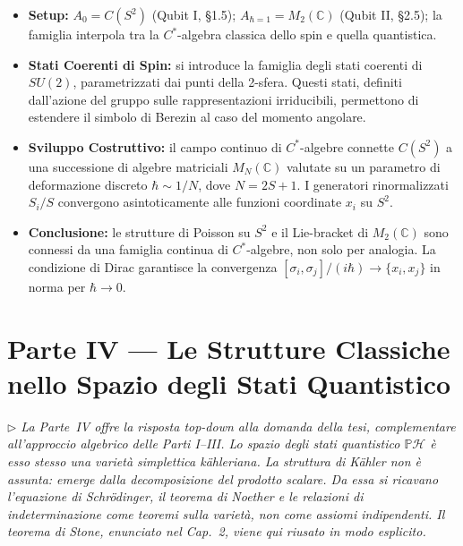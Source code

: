 \documentclass[12pt, a4paper]{article}
\newcommand{\nota}[1]{%
	\par\smallskip
	\noindent\textit{\small $\triangleright$\; #1}
	\par\smallskip
}
\begin{document}
	\begin{itemize}
		\item \textbf{Setup:} $A_0 = C(S^2)$ (Qubit I, §1.5);
		$A_{\hbar=1} = M_2(\mathbb{C})$ (Qubit II, §2.5); la famiglia interpola tra
		la $C^*$-algebra classica dello spin e quella quantistica.
		\item \textbf{Stati Coerenti di Spin:} si introduce la famiglia degli stati coerenti di $SU(2)$, parametrizzati dai punti della 2-sfera. Questi stati, definiti dall'azione del gruppo sulle rappresentazioni irriducibili, permettono di estendere il simbolo di Berezin al caso del momento angolare.
		\item \textbf{Sviluppo Costruttivo:} il campo continuo di $C^*$-algebre connette $C(S^2)$ a una successione di algebre matriciali $M_N(\mathbb{C})$ valutate su un parametro di deformazione discreto $\hbar \sim 1/N$, dove $N = 2S+1$. I generatori rinormalizzati $S_i/S$ convergono asintoticamente alle funzioni coordinate $x_i$ su $S^2$.
		\item \textbf{Conclusione:} le strutture di Poisson su $S^2$ e il Lie-bracket
		di $M_2(\mathbb{C})$ sono connessi da una famiglia continua di $C^*$-algebre,
		non solo per analogia. La condizione di Dirac garantisce la convergenza
		$[\sigma_i,\sigma_j]/(i\hbar) \to \{x_i,x_j\}$ in norma per $\hbar \to 0$.
	\end{itemize}
	\newpage
	\part*{Parte IV --- Le Strutture Classiche nello Spazio degli Stati Quantistico}
	
	\nota{La Parte~IV offre la risposta top-down alla domanda della tesi, complementare
		all'approccio algebrico delle Parti I--III. Lo spazio degli stati quantistico
		$\mathbb{P}\mathcal{H}$ è esso stesso una varietà simplettica kähleriana. La struttura
		di Kähler non è assunta: emerge dalla decomposizione del prodotto scalare. Da essa
		si ricavano l'equazione di Schrödinger, il teorema di Noether e le relazioni di
		indeterminazione come teoremi sulla varietà, non come assiomi indipendenti.
		Il teorema di Stone, enunciato nel Cap.\ 2, viene qui riusato in modo esplicito.}
	
\end{document}
